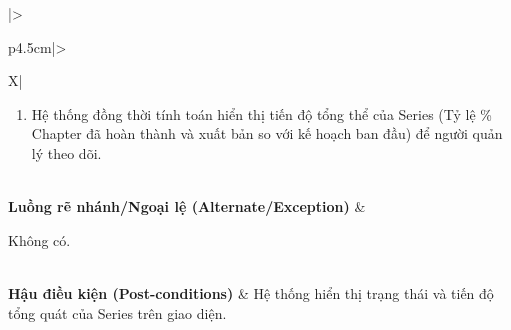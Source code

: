 \begin{table}[H]
\begin{tabularx}{\textwidth}{|>{\raggedright\arraybackslash\bfseries}p{4.5cm}|>{\raggedright\arraybackslash}X|}
\begin{minipage}[t]{\linewidth}
\begin{enumerate}[leftmargin=*]
\begin{itemize}[leftmargin=*]
            \end{itemize}
        \item Hệ thống đồng thời tính toán hiển thị tiến độ tổng thể của Series (Tỷ lệ \% Chapter đã hoàn thành và xuất bản so với kế hoạch ban đầu) để người quản lý theo dõi.
    \end{enumerate}
\end{minipage} \\ \hline
\textbf{Luồng rẽ nhánh/Ngoại lệ (Alternate/Exception)} & 
\begin{minipage}[t]{\linewidth}
    Không có.
\end{minipage} \\ \hline
\textbf{Hậu điều kiện (Post-conditions)} & Hệ thống hiển thị trạng thái và tiến độ tổng quát của Series trên giao diện. \\ \hline
\end{tabularx}
\caption{Đặc tả UC-10: Theo dõi trạng thái Series}
\label{tab:uc10}
\end{table}
